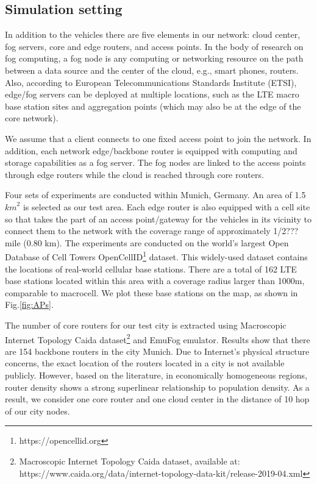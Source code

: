 \documentclass[twocolumn]{article}
\begin{document}
\subsection{Simulation setting}
\par In addition to the vehicles there are five elements in our network: cloud center, fog servers, core and edge routers, and access points.  
In the body of research on fog computing, a fog node is any computing or networking resource on the path between a data source and the center of the cloud, e.g., smart phones, routers\cite{hernandez2017implementing,shi2016edge,gupta2017ifogsim}. Also, according to European Telecommunications Standards Institute (ETSI)\cite{hu2015mobile}, edge/fog servers can be deployed at multiple locations, such as the LTE macro base station sites and aggregation points (which may also be at the edge of the core network).
\par We assume that a client connects to one fixed access point to join the network\cite{mayer2017emufog}. In addition, each network edge/backbone router is equipped with computing and storage capabilities as a fog server. The fog nodes are linked to the access points through edge routers while the cloud is reached through core routers\cite{li2018end}. 
\par Four sets of experiments are conducted within Munich, Germany. An area of 1.5 ${km}^{2}$ is selected as our test area. Each edge router is also equipped with a cell site so that takes the part of an access point/gateway for the vehicles in its vicinity to connect them to the network with the coverage range of approximately 1/2??? mile (0.80 km). The experiments are conducted on the world's largest Open Database of Cell Towers OpenCellID\footnote{https://opencellid.org} dataset. This widely-used dataset contains the locations of real-world cellular base stations. There are a total of 162 LTE base stations located within this area with a coverage radius larger than 1000m, comparable to macrocell. We plot these base stations on the map, as shown in Fig.\ref{fig:APs}. 

\par The number of core routers for our test city is extracted using Macroscopic Internet Topology Caida dataset\footnote{Macroscopic Internet Topology Caida dataset, available at: https://www.caida.org/data/internet-topology-data-kit/release-2019-04.xml} and EmuFog emulator\cite{mayer2017emufog}. Results show that there are 154 backbone routers in the city Munich. Due to Internet’s physical structure concerns, the exact location of the routers located in a city is not available publicly. However, based on the literature, in economically homogeneous regions, router density shows a strong superlinear relationship to population density\cite{canbaz2017comparative,lakhina2003geographic}. As a result, we consider one core router and one cloud center in the distance of 10 hop of our city nodes. 
\end{document}
